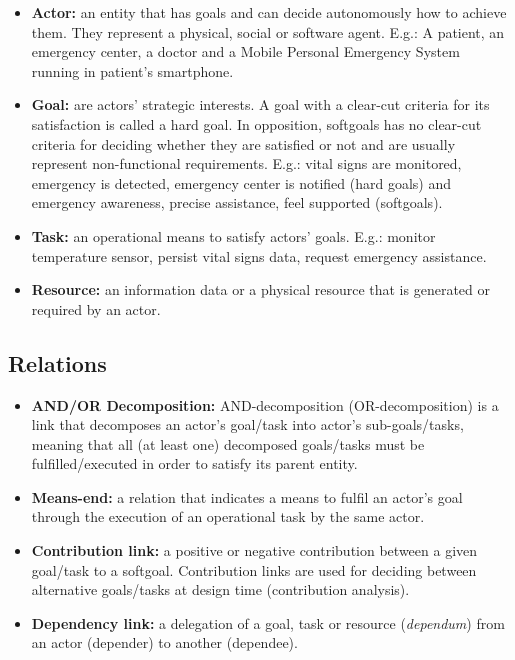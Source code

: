 \begin{itemize}

\item \textbf{Actor:} an entity that has goals and can decide autonomously how to achieve them. They represent a physical, social or software agent. E.g.: A patient, an emergency center, a doctor and a Mobile Personal Emergency System running in patient's smartphone.
\medskip

\item \textbf{Goal:} are actors' strategic interests. A goal with a clear-cut criteria for its satisfaction is called a hard goal. In opposition, softgoals has no clear-cut criteria for deciding whether they are satisfied or not and are usually represent non-functional requirements. E.g.: vital signs are monitored, emergency is detected, emergency center is notified (hard goals) and emergency awareness, precise assistance, feel supported (softgoals).
\medskip

\item \textbf{Task:} an operational means to satisfy actors' goals. E.g.: monitor temperature sensor, persist vital signs data, request emergency assistance.
\medskip

\item \textbf{Resource:} an information data or a physical resource that is generated or required by an actor.

\end{itemize}


\subsection{Relations}

\begin{itemize}

\item \textbf{AND/OR Decomposition:} AND-decomposition (OR-decomposition) is a link that decomposes an actor's goal/task into actor's sub-goals/tasks, meaning that all (at least one) decomposed goals/tasks must be fulfilled/executed in order to satisfy its parent entity. 
\medskip

\item \textbf{Means-end:} a relation that indicates a means to fulfil an actor's goal through the execution of an operational task by the same actor.
\medskip

\item \textbf{Contribution link:} a positive or negative contribution between a given goal/task to a softgoal. Contribution links are used for deciding between alternative goals/tasks at design time (contribution analysis).
\medskip

\item \textbf{Dependency link:} a delegation of a goal, task or resource (\textit{dependum}) from an actor (depender) to another (dependee).

\end{itemize}

